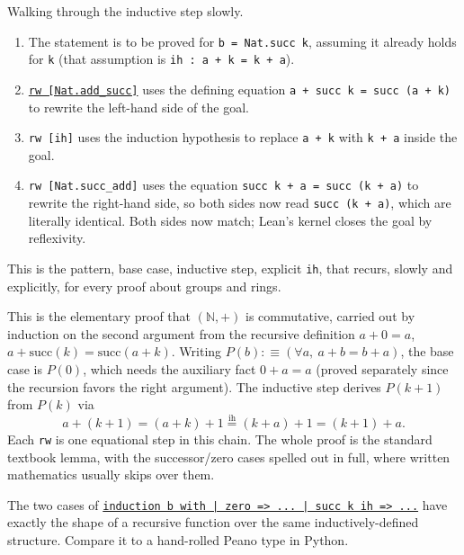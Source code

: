 Walking through the inductive step slowly.

\begin{enumerate}
\def\labelenumi{\arabic{enumi}.}
\tightlist
\item
  The statement is to be proved for \texttt{b = Nat.succ k}, assuming it already holds for \texttt{k} (that assumption is \texttt{ih : a + k = k + a}).
\item
  \href{https://lean-lang.org/doc/reference/latest/Tactic-Proofs/Tactic-Reference/}{\texttt{rw [Nat.add\_\allowbreak{}succ]}} uses the defining equation \texttt{a + succ k = succ (a + k)} to rewrite the left-hand side of the goal.
\item
  \texttt{rw [ih]} uses the induction hypothesis to replace \texttt{a + k} with \texttt{k + a} inside the goal.
\item
  \texttt{rw [Nat.succ\_\allowbreak{}add]} uses the equation \texttt{succ k + a = succ (k + a)} to rewrite the right-hand side, so both sides now read \texttt{succ (k + a)}, which are literally identical. Both sides now match; Lean's kernel closes the goal by reflexivity.
\end{enumerate}

This is the pattern, base case, inductive step, explicit \texttt{ih}, that recurs, slowly and explicitly, for every proof about groups and rings.

\begin{mathreading}

This is the elementary proof that \((\mathbb{N},
+)\) is commutative, carried out by induction on the second argument from the recursive definition \(a + 0 = a\), \(a + \mathrm{succ}(k) = \mathrm{succ}(a +
k)\). Writing \(P(b) :\equiv (\forall a,\ a + b = b + a)\), the base case is \(P(0)\), which needs the auxiliary fact \(0 + a = a\) (proved separately since the recursion favors the right argument). The inductive step derives \(P(k+1)\) from \(P(k)\) via \[
a + (k{+}1) = (a+k){+}1 \overset{\mathrm{ih}}{=} (k+a){+}1 = (k{+}1)+a.
\] Each \texttt{rw} is one equational step in this chain. The whole proof is the standard textbook lemma, with the successor/zero cases spelled out in full, where written mathematics usually skips over them.

\end{mathreading}

\begin{progcorner}

The two cases of \href{https://lean-lang.org/doc/reference/latest/Tactic-Proofs/Tactic-Reference/}{\texttt{induction b with | zero => ... | succ k ih => ...}} have exactly the shape of a recursive function over the same inductively-defined structure. Compare it to a hand-rolled Peano type in Python.

\end{progcorner}


